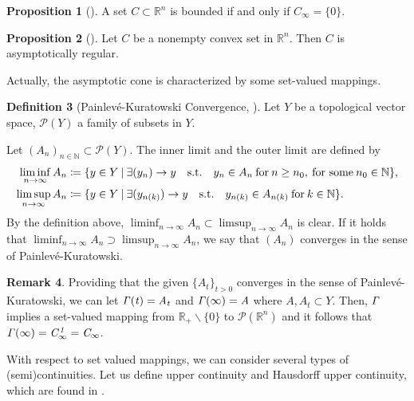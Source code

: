 \documentclass[a4paper,11pt]{jsarticle}
\theoremstyle{definition}
\newtheorem{dfn}{Definition}[section]
\newtheorem{prop}[dfn]{Proposition}
\newtheorem{rem}[dfn]{Remark}
\newcommand{\NaturalNumberSet}{\mathbb{N}}
\newcommand{\RealNumberSet}{\mathbb{R}}
\newcommand{\NDemenstionalRealEuclideanSpace}{\mathbb{R}^n}
\newcommand{\SuchThat}{\quad\text{s.t.}\quad}
\newcommand{\Painleve}{Painlev\'e}
\newcommand{\SetValudMapping}{\it \Gamma}
\newcommand{\SetForm}[2]{
  \{{#1}\:|\:{#2}\}
}
\begin{document}
\begin{prop}[\cite{Auslender03}]
  A set $C \subset \mathbb{R}^n$ is bounded if and only if $C_\infty = \{0\}$.
\end{prop}

\begin{prop}[\cite{Auslender03}]
  Let $C$ be a nonempty convex set in $\NDemenstionalRealEuclideanSpace$. Then $C$ is asymptotically regular.
\end{prop}

Actually, the asymptotic cone is characterized by some set-valued mappings.

\begin{dfn}[\Painleve-Kuratowski Convergence, \cite{Auslender03}]
  Let $Y$ be a topological vector space, $\mathcal{P}(Y)$ a family of subsets in $Y$.

  Let $(A_n)_{n \in \NaturalNumberSet} \subset \mathcal{P}(Y)$. The inner limit and the outer limit are defined by
  \begin{equation}
    \begin{split}
      \liminf_{n \to \infty}A_n &\coloneqq \SetForm{y \in Y}{\exists (y_n) \to y \SuchThat y_n \in A_n \:\text{for}\: n \geq n_0, \:\text{for some}\:n_0 \in \NaturalNumberSet}, \\
      \limsup_{n \to \infty}A_n &\coloneqq \SetForm{y \in Y}{\exists (y_{n(k)}) \to y \SuchThat y_{n(k)} \in A_{n(k)} \:\text{for}\: k \in \NaturalNumberSet}. \notag
    \end{split}
  \end{equation}
  By the definition above, $\liminf_{n \to \infty}A_n \subset \limsup_{n \to \infty}A_n$ is clear. If it holds that $\liminf_{n \to \infty}A_n \supset \limsup_{n \to \infty}A_n$, we say that $(A_n)$ converges in the sense of \Painleve-Kuratowski.
\end{dfn}

\begin{rem}
  Providing that the given $\{A_t\}_{t>0}$ converges in the sense of \Painleve-Kuratowski, we can let $\SetValudMapping (t) = A_t$ and $\SetValudMapping (\infty) = A$ where $A, A_t \subset Y$.
  Then, $\SetValudMapping$ implies a set-valued mapping from $\RealNumberSet_{+}\backslash\{0\}$ to $\mathcal{P}(\NDemenstionalRealEuclideanSpace)$ and it follows that $\SetValudMapping (\infty) = C^1_{\infty} = C_{\infty}$.
\end{rem}

With respect to set valued mappings, we can consider several types of (semi)continuities. Let us define upper continuity and Hausdorff upper continuity, which are found in \cite{Tammer03}.
\end{document}
